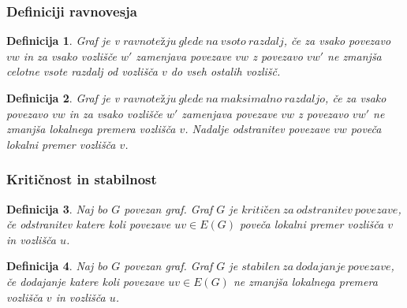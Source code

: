 \documentclass[12pt, hyperref={unicode}]{beamer}
\newtheorem{definicija}{Definicija}
\begin{document}
\begin{frame}
   
    \frametitle{Definiciji ravnovesja}
    \begin{definicija}
       Graf je v $ravnotežju \ glede \ na \ vsoto \ razdalj$, če za vsako povezavo $vw$ in
       za vsako vozlišče $w'$ zamenjava povezave $vw$ z povezavo $vw'$ ne zmanjša
       celotne vsote razdalj od vozlišča $v$ do vseh ostalih vozlišč.
    \end{definicija}

    \begin{definicija}
        Graf je v $ravnotežju \ glede \ na \ maksimalno \ razdaljo$, če za vsako povezavo $vw$
        in za vsako vozlišče $w'$ zamenjava povezave $vw$ z povezavo $vw'$ ne zmanjša
        lokalnega premera vozlišča $v$. Nadalje odstranitev povezave $vw$ poveča
        lokalni premer vozlišča $v$.
    \end{definicija}

\end{frame}

\begin{frame}
   
    \frametitle{Kritičnost in stabilnost}  
    \begin{definicija}
        Naj bo $G$ povezan graf. Graf $G$ je $kritičen \ za \ odstranitev \ povezave$,
        če odstranitev katere koli povezave $uv \in E(G)$ poveča lokalni premer vozlišča $v$ in vozlišča $u$.
    \end{definicija}

    \begin{definicija}
        Naj bo $G$ povezan graf. Graf $G$ je $stabilen \ za \ dodajanje \ povezave$,
        če dodajanje katere koli povezave $uv \in E(G)$ ne zmanjša lokalnega premera vozlišča $v$ in vozlišča $u$.
    \end{definicija}

\end{frame}
  
\end{document}
